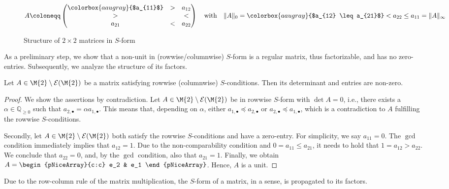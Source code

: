 \begin{figure}[htbp]
\[ A \coloneqq \begin{pmatrix} \colorbox{aaugray}{$a_{11}$} & > & a_{12} \\ > & & < \\ a_{21} & < & a_{22} \end{pmatrix} \quad \text{with} \quad \| A\|_0 = \colorbox{aaugray}{$a_{12} \leq a_{21}$} < a_{22} \leq a_{11} = \| A \|_{\infty} \]
\caption{Structure of $2 \times 2$ matrices in $S$-form}\label{fig:s-form}
\end{figure}

As a preliminary step, we show that a non-unit in (rowwise/columnwise) $S$-form is a regular matrix, thus factorizable, and has no zero-entries. Subsequently, we analyze the structure of its factors.

\enlargethispage{1\baselineskip}
\begin{lemma}\label{lemma:s-form-non-zero}
Let $A \in \M{2}\setminus\mathcal{E}(\M{2})$ be a matrix satisfying rowwise (columnwise) $S$-conditions. Then its determinant and entries are non-zero.
\end{lemma}

\begin{proof}
We show the assertions by contradiction. Let $A \in \M{2}\setminus\mathcal{E}(\M{2})$ be in rowwise $S$-form with $\det{A} = 0$, i.e., there exists a $\alpha \in \mathbb{Q}_{\geq 0}$ such that $a_{2,\bullet} = \alpha a_{1,\bullet}$. This means that, depending on $\alpha$, either $a_{1,\bullet} \preceq a_{2,\bullet}$ or $a_{2,\bullet} \preceq a_{1,\bullet}$, which is a contradiction to $A$ fulfilling the rowwise $S$-conditions.

Secondly, let $A \in \M{2}\setminus\mathcal{E}(\M{2})$ both satisfy the rowwise $S$-conditions and have a zero-entry. For simplicity, we say $a_{11} = 0$. The $\gcd$ condition immediately implies that $a_{12} = 1$. Due to the non-comparability condition and $0 = a_{11} \leq a_{21}$, it needs to hold that $1= a_{12} > a_{22}$. We conclude that $a_{22} = 0$, and, by the $\gcd$ condition, also that $a_{21} = 1$. Finally, we obtain $A = \begin{pNiceArray}{c:c} e_2 &  e_1 \end{pNiceArray}$. Hence, $A$ is a unit.
\end{proof}

Due to the row-column rule of the matrix multiplication, the $S$-form of a matrix, in a sense, is propagated to its factors.

